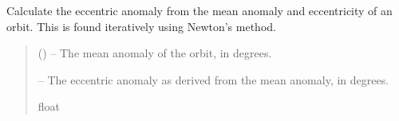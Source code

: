\documentclass[letterpaper,11pt,english]{sphinxmanual}
\begin{document}

\begin{savenotes}\begin{fulllineitems}
\label{\detokenize{code/opihiexarata.orbit.solution:opihiexarata.orbit.solution._calculate_eccentric_anomaly}}
\pysigstartsignatures
{}
\pysigstopsignatures
\sphinxAtStartPar
Calculate the eccentric anomaly from the mean anomaly and eccentricity
of an orbit. This is found iteratively using Newton’s method.
\begin{quote}\begin{description}
\sphinxAtStartPar
{} () – The mean anomaly of the orbit, in degrees.

\sphinxAtStartPar
{} – The eccentric anomaly as derived from the mean anomaly, in degrees.

\sphinxAtStartPar
float

\end{description}\end{quote}

\end{fulllineitems}\end{savenotes}

\end{document}
